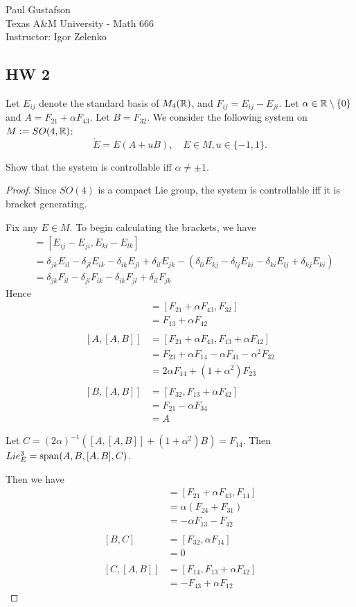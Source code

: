 \documentclass{article}
\begin{document}
\noindent Paul Gustafson\\
\noindent Texas A\&M University - Math 666\\ 
\noindent Instructor: Igor Zelenko

\subsection*{HW 2}
 Let $E_{ij}$ denote the standard basis of $M_4(\mathbb{R})$, and $F_{ij} = E_{ij} - E_{ji}$.  Let $\alpha \in \mathbb{R} \setminus \{0\}$ and $A = F_{21} + \alpha F_{43}$.  Let $B = F_{32}$.  We consider the following system on $M := SO(4, \mathbb{R})$:
$$\dot E = E ( A + u B),  \quad E \in M, u \in \{-1, 1\}.$$

 Show that the system is controllable iff $\alpha \neq \pm 1$.
\begin{proof}
Since $SO(4)$ is a compact Lie group, the system is controllable iff it is bracket generating. 

Fix any $E \in M$. To begin calculating the brackets, we have
\begin{align*}
[F_{ij}, F_{kl}] & = [E_{ij} - E_{ji}, E_{kl} - E_{lk}] 
\\ & = \delta_{jk} E_{il} - \delta_{jl} E_{ik} - \delta_{ik} E_{jl} + \delta_{il} E_{jk} - (\delta_{li} E_{kj} - \delta_{lj} E_{ki} - \delta_{ki} E_{lj} + \delta_{kj} E_{ki})
\\ & = \delta_{jk} F_{il} - \delta_{jl} F_{ik} - \delta_{ik} F_{jl} + \delta_{il} F_{jk}
\end{align*}
Hence
\begin{align*}
[A, B] & = [F_{21} + \alpha F_{43}, F_{32}]
\\ & = F_{13} + \alpha F_{42}
\\ 
\\ [A, [A, B]] & = [F_{21} + \alpha F_{43}, F_{13} + \alpha F_{42}]
\\ & = F_{23} + \alpha F_{14} - \alpha F_{41} - \alpha^2 F_{32}
\\ & = 2 \alpha F_{14} + (1 + \alpha^2) F_{23}
\\ 
\\ [B, [A, B]] &  = [F_{32}, F_{13} + \alpha F_{42}]
\\ & = F_{21} - \alpha F_{34}
\\ & = A
\end{align*}

Let $C = (2\alpha)^{-1} ([A, [A, B]] + (1+\alpha^2) B) = F_{14}$. Then $Lie^3_E = \operatorname{span}(A, B, [A,B], C)$. 

Then we have
\begin{align*}
[A, C] & = [F_{21} + \alpha F_{43}, F_{14}]
\\ & = \alpha (F_{24} +  F_{31})
\\ & = - \alpha F_{13} -  F_{42}
\\
\\ [B, C] & = [F_{32}, \alpha F_{14}]
\\ & = 0
\\
\\ [C, [A,B]] & = [ F_{14}, F_{13} + \alpha F_{42}] 
\\ & =  - F_{43} + \alpha F_{12}
\end{align*}


\end{proof}
\end{document}
